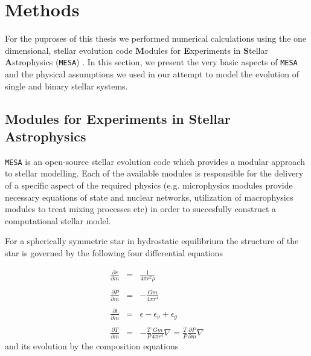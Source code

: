\documentclass[../../main/thesis_msc.tex]{subfiles}
\begin{document}
    \chapter{Methods}
    
    	For the puproses of this thesis we performed numerical calculations using the one dimensional, stellar evolution code \textbf{M}odules for \textbf{E}xperiments in \textbf{S}tellar \textbf{A}strophysics (\texttt{MESA}) \citep{Paxton2011, Paxton2013, Paxton2015, Paxton2018}. In this section, we present the very basic aspects of \texttt{MESA} and the physical assumptions we used in our attempt to model the evolution of single and binary stellar systems.
    	
    		\section{Modules for Experiments in Stellar Astrophysics}
    		
    			\texttt{MESA} is an open-source stellar evolution code which provides a modular approach to stellar modelling. Each of the available modules is responsible for the delivery of a specific aspect of the required physics (e.g. microphysics modules provide necessary equations of state and nuclear networks, utilization of macrophysics modules to treat mixing processes etc) in order to succesfully construct a computational stellar model.
    			
    			For a spherically symmetric star in hydrostatic equilibrium the structure of the star is governed by the following four differential equations
    			
    			\begin{eqnarray}
    				\frac{\partial r}{\partial m} &=& \frac{1}{4 \pi r^2 \rho} \label{eq:2.1} \\ \nonumber \\
    				\frac{\partial P}{\partial m} &=& - \frac{G m}{4 \pi r^4} \label{eq:2.2 }\\ \nonumber \\
    				\frac{\partial l}{\partial m} &=& \epsilon - \epsilon_{\nu} + \epsilon_g \label{eq:2.3} \\ \nonumber \\
    				\frac{\partial T}{\partial m} &=& - \frac{T}{P} \frac{G m}{4 \pi r^4} \nabla = \frac{T}{P} \frac{\partial P}{\partial m} \nabla \label{eq:2.4}
    			\end{eqnarray}
    			and its evolution by the composition equations
    			
\end{document}
